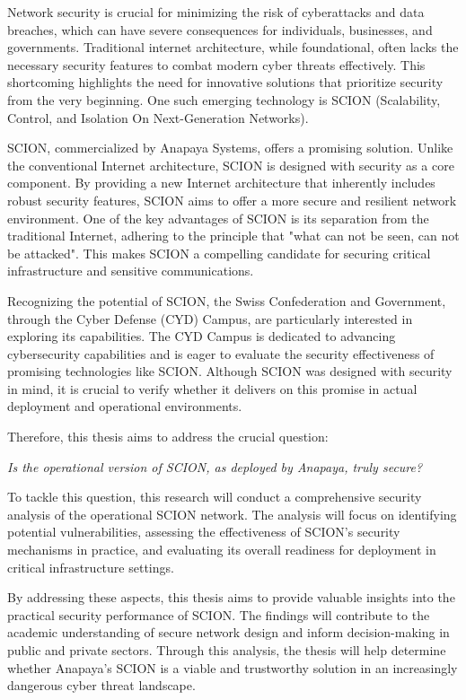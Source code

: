 Network security is crucial for minimizing the risk of cyberattacks and data breaches, which can have severe consequences for individuals, businesses, and governments.
Traditional internet architecture, while foundational, often lacks the necessary security features to combat modern cyber threats effectively.
This shortcoming highlights the need for innovative solutions that prioritize security from the very beginning.
One such emerging technology is SCION (Scalability, Control, and Isolation On Next-Generation Networks).

SCION, commercialized by Anapaya Systems, offers a promising solution.
Unlike the conventional Internet architecture, SCION is designed with security as a core component.
By providing a new Internet architecture that inherently includes robust security features, SCION aims to offer a more secure and resilient network environment.
One of the key advantages of SCION is its separation from the traditional Internet, adhering to the principle that "what can not be seen, can not be attacked".
This makes SCION a compelling candidate for securing critical infrastructure and sensitive communications.

Recognizing the potential of SCION, the Swiss Confederation and Government, through the Cyber Defense (CYD) Campus, are particularly interested in exploring its capabilities.
The CYD Campus is dedicated to advancing cybersecurity capabilities and is eager to evaluate the security effectiveness of promising technologies like SCION.
Although SCION was designed with security in mind, it is crucial to verify whether it delivers on this promise in actual deployment and operational environments.

Therefore, this thesis aims to address the crucial question:
\begin{center}
    \textit{Is the operational version of SCION, as deployed by Anapaya, truly secure?}
\end{center}

To tackle this question, this research will conduct a comprehensive security analysis of the operational SCION network.
The analysis will focus on identifying potential vulnerabilities, assessing the effectiveness of SCION's security mechanisms in practice, and evaluating its overall readiness for deployment in critical infrastructure settings.

By addressing these aspects, this thesis aims to provide valuable insights into the practical security performance of SCION.
The findings will contribute to the academic understanding of secure network design and inform decision-making in public and private sectors.
Through this analysis, the thesis will help determine whether Anapaya's SCION is a viable and trustworthy solution in an increasingly dangerous cyber threat landscape.


